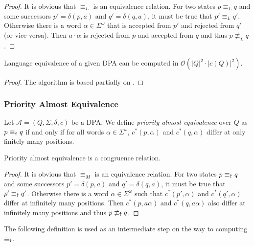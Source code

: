 \begin{proof}
	It is obvious that $\equiv_L$ is an equivalence relation. For two states $p \equiv_L q$ and some successors $p' = \delta(p, a)$ and $q' = \delta(q, a)$, it must be true that $p' \equiv_L q'$. Otherwise there is a word $\alpha \in \Sigma^\omega$ that is accepted from $p'$ and rejected from $q'$ (or vice-versa). Then $a \cdot \alpha$ is rejected from $p$ and accepted from $q$ and thus $p \not\equiv_L q$.
\end{proof}

\begin{lem}
	Language equivalence of a given DPA can be computed in $\mathcal{O}(|Q|^2 \cdot |c(Q)|^2)$.
\end{lem}

\begin{proof}
	The algorithm is based partially on \cite{HenzingerTelle1996}. %
\end{proof}


\subsubsection{Priority Almost Equivalence}

\begin{defn}
	Let $\mathcal{A} = (Q, \Sigma, \delta, c)$ be a DPA. We define \emph{priority almost equivalence} over $Q$ as $p \equiv_\text{\Ankh} q$ if and only if for all words $\alpha \in \Sigma^\omega$, $c^*(p, \alpha)$ and $c^*(q, \alpha)$ differ at only finitely many positions.
\end{defn}

\begin{lem}
	Priority almost equivalence is a congruence relation.
\end{lem}

\begin{proof}
	It is obvious that $\equiv_M$ is an equivalence relation. For two states $p \equiv_\text{\Ankh} q$ and some successors $p' = \delta(p, a)$ and $q' = \delta(q, a)$, it must be true that $p' \equiv_\text{\Ankh} q'$. Otherwise there is a word $\alpha \in \Sigma^\omega$ such that $c^*(p', \alpha)$ and $c^*(q', \alpha)$ differ at infinitely many positions. Then $c^*(p, a \alpha)$ and $c^*(q, a \alpha)$ also differ at infinitely many positions and thus $p \not\equiv_\text{\Ankh} q$.
\end{proof}

The following definition is used as an intermediate step on the way to computing $\equiv_\text{\Ankh}$.

